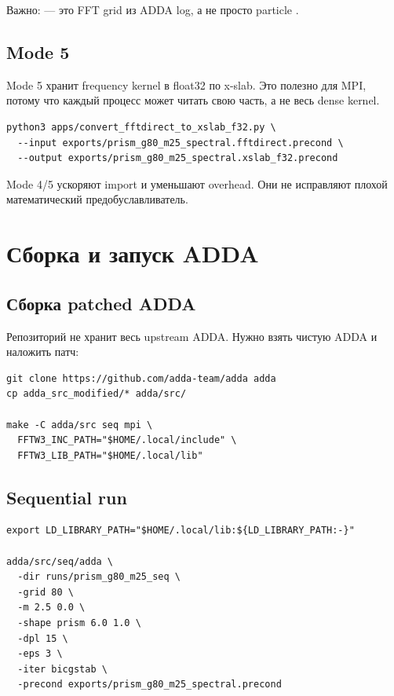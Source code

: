 \documentclass[11pt,a4paper,oneside]{book}
\newcommand{\code}[1]{\texttt{\detokenize{#1}}}
\begin{document}
Важно: \code{grid-x/y/z} --- это FFT grid из ADDA log, а не просто particle
\code{-grid}.

\section{Mode 5}

Mode 5 хранит frequency kernel в float32 по x-slab. Это полезно для MPI, потому
что каждый процесс может читать свою часть, а не весь dense kernel.

\begin{lstlisting}
python3 apps/convert_fftdirect_to_xslab_f32.py \
  --input exports/prism_g80_m25_spectral.fftdirect.precond \
  --output exports/prism_g80_m25_spectral.xslab_f32.precond
\end{lstlisting}

Mode 4/5 ускоряют import и уменьшают overhead. Они не исправляют плохой
математический предобуславливатель.

\chapter{Сборка и запуск ADDA}

\section{Сборка patched ADDA}

Репозиторий не хранит весь upstream ADDA. Нужно взять чистую ADDA и наложить
патч:

\begin{lstlisting}
git clone https://github.com/adda-team/adda adda
cp adda_src_modified/* adda/src/

make -C adda/src seq mpi \
  FFTW3_INC_PATH="$HOME/.local/include" \
  FFTW3_LIB_PATH="$HOME/.local/lib"
\end{lstlisting}

\section{Sequential run}

\begin{lstlisting}
export LD_LIBRARY_PATH="$HOME/.local/lib:${LD_LIBRARY_PATH:-}"

adda/src/seq/adda \
  -dir runs/prism_g80_m25_seq \
  -grid 80 \
  -m 2.5 0.0 \
  -shape prism 6.0 1.0 \
  -dpl 15 \
  -eps 3 \
  -iter bicgstab \
  -precond exports/prism_g80_m25_spectral.precond
\end{lstlisting}
\end{document}
